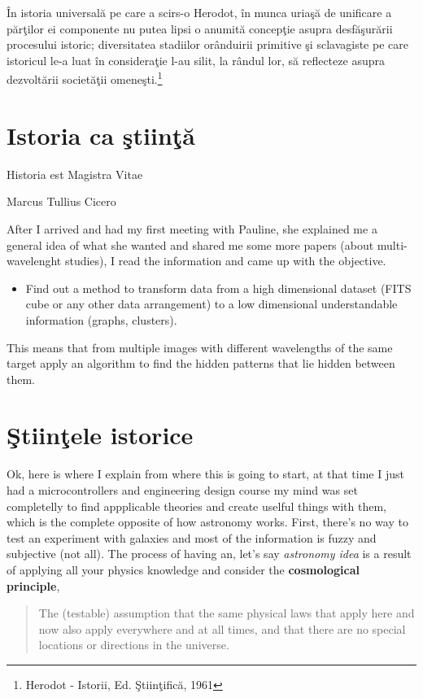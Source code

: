 În istoria universală pe care a scirs-o Herodot, în munca uriaşă de unificare a părţilor ei componente nu putea lipsi o anumită concepţie asupra desfăşurării procesului istoric; diversitatea stadiilor orânduirii primitive şi sclavagiste pe care istoricul le-a luat în consideraţie l-au silit, la rândul lor, să reflecteze asupra dezvoltării societăţii omeneşti.\footnote{Herodot - Istorii, Ed. Ştiinţifică, 1961} 
\newpage

\section{Istoria ca ştiinţă}
\epigraph{Historia est Magistra Vitae}{Marcus Tullius Cicero}
After I arrived and had my first meeting with Pauline, she explained me a general idea of what she wanted and shared me some more papers (about multi-wavelenght studies), I read the information and came up with the objective.

\begin{itemize}
\item Find out a method to transform data from a high dimensional dataset (FITS cube or any other data arrangement) to a low dimensional understandable information (graphs, clusters).
\end{itemize}

This means that from multiple images with different wavelengths of the same target apply an algorithm to find the hidden patterns that lie hidden between them.

\section{Ştiinţele istorice}
Ok, here is where I explain from where this is going to start, at that time I just had a microcontrollers and engineering design course my mind was set completelly to find appplicable theories and create uselful things with them, which is the complete opposite of how astronomy works. First, there's no way to test an experiment with galaxies and most of the information is fuzzy and subjective (not all). The process of having an, let's say \emph{astronomy idea} is a result of applying all your physics knowledge and consider the \textbf{cosmological principle},
\begin{quote}
The (testable) assumption that the same physical laws that apply here and now also apply everywhere and at all times, and that there are no special locations or directions in the universe.
\end{quote}

